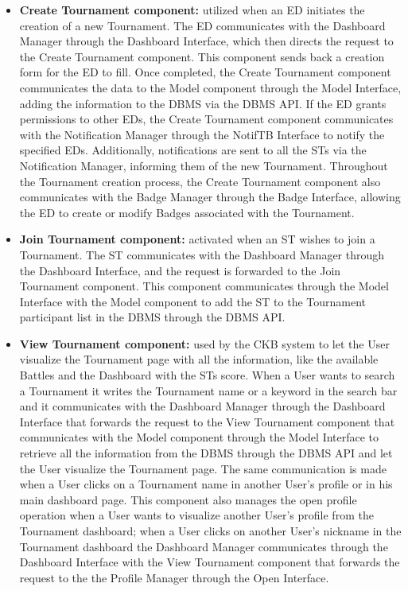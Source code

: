 \begin{itemize}
    \item \textbf{Create Tournament component:} utilized when an ED initiates the creation of a new Tournament. The ED communicates with the Dashboard Manager through the Dashboard Interface, which then directs the request to the Create Tournament component. This component sends back a creation form for the ED to fill. Once completed, the Create Tournament component communicates the data to the Model component through the Model Interface, adding the information to the DBMS via the DBMS API. If the ED grants permissions to other EDs, the Create Tournament component communicates with the Notification Manager through the NotifTB Interface to notify the specified EDs. Additionally, notifications are sent to all the STs via the Notification Manager, informing them of the new Tournament. Throughout the Tournament creation process, the Create Tournament component also communicates with the Badge Manager through the Badge Interface, allowing the ED to create or modify Badges associated with the Tournament.
    \item \textbf{Join Tournament component:} activated when an ST wishes to join a Tournament. The ST communicates with the Dashboard Manager through the Dashboard Interface, and the request is forwarded to the Join Tournament component. This component communicates through the Model Interface with the Model component to add the ST to the Tournament participant list in the DBMS through the DBMS API. 
    \item \textbf{View Tournament component:} used by the CKB system to let the User visualize the Tournament page with all the information, like the available Battles and the Dashboard with the STs score. When a User wants to search a Tournament it writes the Tournament name or a keyword in the search bar and it communicates with the Dashboard Manager through the Dashboard Interface that forwards the request to the View Tournament component that communicates with the Model component through the Model Interface to retrieve all the information from the DBMS through the DBMS API and let the User visualize the Tournament page. The same communication is made when a User clicks on a Tournament name in another User’s profile or in his main dashboard page. This component also manages the open profile operation when a User wants to visualize another User’s profile from the Tournament dashboard; when a User clicks on another User’s nickname in the Tournament dashboard the Dashboard Manager communicates through the Dashboard Interface with the View Tournament component that forwards the request to the the Profile Manager through the Open Interface.

\end{itemize}
